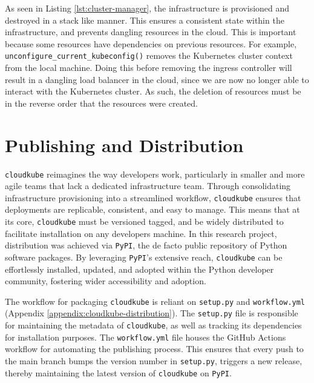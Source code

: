 As seen in Listing \ref{lst:cluster-manager}, the infrastructure is provisioned and destroyed in a stack like manner. This ensures a consistent state within the infrastructure, and 
prevents dangling resources in the cloud. This is important because some resources have dependencies on previous resources. For example, \texttt{unconfigure\_current\_kubeconfig()} removes the
Kubernetes cluster context from the local machine. Doing this before removing the ingress controller will result in a dangling load balancer in the cloud, since we are now no longer able to 
interact with the Kubernetes cluster. As such, the deletion of resources must be in the reverse order that the resources were created. 

\section{Publishing and Distribution}
\texttt{cloudkube} reimagines the way developers work, particularly in smaller and more agile teams that lack a dedicated infrastructure team. Through consolidating infrastructure provisioning
into a streamlined workflow, \texttt{cloudkube} ensures that deployments are replicable, consistent, and easy to manage. This means that at its core, \texttt{cloudkube} must be versioned tagged, and be 
widely distributed to facilitate installation on any developers machine. In this research project, distribution was achieved via \texttt{PyPI}, the de facto public repository
of Python software packages. By leveraging \texttt{PyPI}'s extensive reach, \texttt{cloudkube} can be effortlessly installed, updated, and adopted within the Python developer community,
fostering wider accessibility and adoption. 

The workflow for packaging \texttt{cloudkube} is reliant on \texttt{setup.py} and \texttt{workflow.yml} (Appendix \ref{appendix:cloudkube-distribution}). The \texttt{setup.py} file is responsible for maintaining
the metadata of \texttt{cloudkube}, as well as tracking its dependencies for installation purposes. The \texttt{workflow.yml} file houses the GitHub Actions workflow for automating the publishing process. 
This ensures that every push to the main branch bumps the version number in \texttt{setup.py}, triggers a new release, thereby maintaining the latest version of \texttt{cloudkube} on \texttt{PyPI}. 